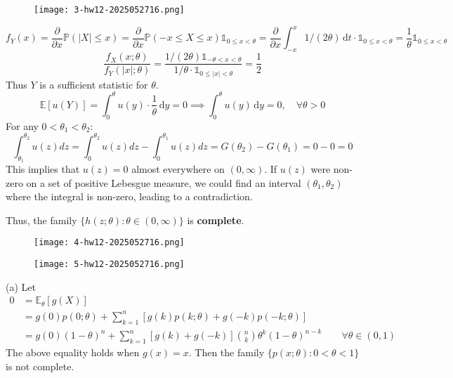 \begin{exercise}
\begin{figure}[H]
\centering
\texttt{[image: 3-hw12-2025052716.png]}
\label{}
\end{figure}
\end{exercise}
\[
f_{Y}(x)=\frac{ \partial   }{ \partial x } \mathbb{P}(\lvert X \rvert \leq x)=\frac{ \partial   }{ \partial x } \mathbb{P}(-x\leq X\leq x)\mathbb{1}_{0\leq x<\theta}=\frac{ \partial   }{ \partial x } \int_{-x}^{x} 1/(2\theta) \, \mathrm{d}t \cdot \mathbb{1}_{0\leq x<\theta}=\frac{1}{\theta}\mathbb{1}_{0\leq x<\theta}
\]
\[
\frac{f_{X}(x;\theta)}{f_{Y}(\lvert x \rvert ;\theta)}=\frac{1/(2\theta)\mathbb{1}_{-\theta<x<\theta}}{1/\theta \cdot \mathbb{1}_{0\leq \lvert x \rvert <\theta}}=\frac{1}{2}
\]
Thus $Y$ is a sufficient statistic for $\theta$.
\[
\mathbb{E}[u(Y)]=\int_{0}^{\theta} u(y)\cdot\frac{1}{\theta} \, \mathrm{d}y=0\implies \int_{0}^{\theta} u(y) \, \mathrm{d}y=0,\quad \forall \theta>0
\]
For any $0 < \theta_1 < \theta_2$:
\[
\int_{\theta_1}^{\theta_2} u(z) dz = \int_0^{\theta_2} u(z) dz - \int_0^{\theta_1} u(z) dz = G(\theta_2) - G(\theta_1) = 0 - 0 = 0
\]
This implies that $u(z) = 0$ almost everywhere on $(0, \infty)$. If $u(z)$ were non-zero on a set of positive Lebesgue measure, we could find an interval $(\theta_1, \theta_2)$ where the integral is non-zero, leading to a contradiction.

Thus, the family $\{h(z;\theta):\theta\in(0,\infty)\}$ is \textbf{complete}.

\begin{exercise}
\begin{figure}[H]
\centering
\texttt{[image: 4-hw12-2025052716.png]}
\label{}
\end{figure}
\begin{figure}[H]
\centering
\texttt{[image: 5-hw12-2025052716.png]}
\label{}
\end{figure}
\end{exercise}
(a)
Let
\[
\begin{aligned}
0 & =\mathbb{E}_{\theta}[g(X)] \\
 & =g(0)p(0;\theta)+\sum_{k=1}^{n} [g(k)p(k;\theta)+g(-k)p(-k;\theta)] \\
 & =g(0)(1-\theta)^{n}+\sum_{k=1}^{n} [g(k)+g(-k)]\binom{n}{k} \theta^{k}(1-\theta)^{n-k}\qquad \forall \theta\in(0,1)
\end{aligned}
\]
The above equality holds when $g(x)=x$. Then the family $\{ p(x;\theta):0<\theta<1 \}$ is not complete.

